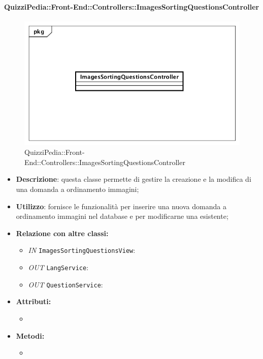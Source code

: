 \paragraph{QuizziPedia::Front-End::Controllers::ImagesSortingQuestionsController}
\begin{figure}
	\centering
	\includegraphics[scale=0.45]{UML/Classi/Front-End/QuizziPedia_Front-end_Controller_ImagesSortingQuestionsController.png}
	\caption{QuizziPedia::Front-End::Controllers::ImagesSortingQuestionsController}
\end{figure}
\begin{itemize}
	\item \textbf{Descrizione}: questa classe permette di gestire la creazione e la modifica di una domanda a ordinamento immagini;
	\item \textbf{Utilizzo}: fornisce le funzionalità per inserire una nuova domanda a ordinamento immagini nel database e per modificarne una esistente;
	\item \textbf{Relazione con altre classi:}
	\begin{itemize}
		\item \textit{IN} \texttt{ImagesSortingQuestionsView}:  
		\item \textit{OUT} \texttt{LangService}: 
		\item \textit{OUT} \texttt{QuestionService}:
	\end{itemize}
	\item \textbf{Attributi:}
	\begin{itemize}
		\item 
	\end{itemize}
	\item \textbf{Metodi:}
	\begin{itemize}
		\item 
	\end{itemize}
\end{itemize}

